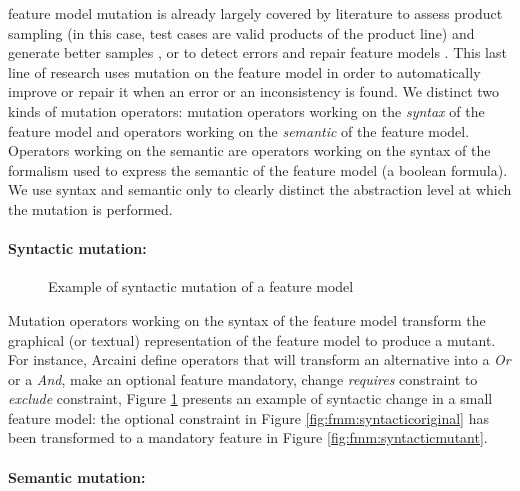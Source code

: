 \Gls{feature model} mutation is already largely covered by literature to assess product sampling (in this case, test cases are valid products of the product line) and generate better samples \cite{Henard2014,Reuling2015a,Lackner2014,Arcaini2015a}, or to detect errors and repair feature models \cite{Henard2013b,Arcaini2016a,Arcaini2017}. This last line of research uses mutation on the feature model in order to automatically improve or repair it when an error or an inconsistency is found. We distinct two kinds of mutation operators: mutation operators working on the \emph{syntax} of the feature model and operators working on the \emph{semantic} of the feature model. Operators working on the semantic are operators working on the syntax of the formalism used to express the semantic of the feature model (\ie a boolean formula). We use syntax and semantic only to clearly distinct the abstraction level at which the mutation is performed.

\paragraph{Syntactic mutation:}

\begin{figure}
	\centering
	\caption{Example of syntactic mutation of a feature model \cite{Arcaini2015a}}
	\label{fig:fmm:syntactic}
\end{figure}

Mutation operators working on the syntax of the feature model transform the graphical (or textual) representation of the feature model to produce a mutant. For instance, Arcaini \etal \cite{Arcaini2015a} define operators that will transform an alternative into a \textit{Or} or a \textit{And}, make an optional feature mandatory, change \textit{requires} constraint to \textit{exclude} constraint, \etc Figure \ref{fig:fmm:syntactic} presents an example of syntactic change in a small feature model: the optional constraint in Figure \ref{fig:fmm:syntacticoriginal} has been transformed to a mandatory feature in Figure \ref{fig:fmm:syntacticmutant}.

\paragraph{Semantic mutation:}

